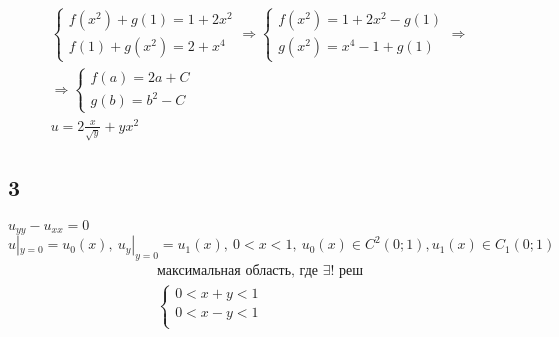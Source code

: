 \begin{gather*}
  \begin{cases}
  f(x^{2})+g(1)=1+2x^{2} \\ f(1)+g(x^{2})=2+x^{4}
  \end{cases} \Rightarrow \begin{cases}
    f(x^{2})=1+2x^{2}-g(1) \\ g(x^{2})=x^{4}-1+g(1)
  \end{cases} \Rightarrow \\
  \Rightarrow \begin{cases}
    f(a)=2a+C \\ g(b)=b^{2}-C
  \end{cases} \\
  \boxed{u= 2\frac{x}{\sqrt{y}}+yx^{2}}
\end{gather*}
\subsection{3}
$u_{yy}-u_{xx}=0$ \\
$u|_{y=0}=u_{0}(x),\ u_{y}|_{y=0}=u_{1}(x), \ 0 < x < 1, \ u_{0}(x) \in C^{2}(0;1), u_{1}(x)
 \in C_{1}(0;1)$ \\ 
\begin{gather*}
  \text{максимальная область, где $\exists$! реш} \\ 
  \begin{cases}
   0 < x + y < 1 \\ 0< x-y<1 \\ 
  \end{cases}
\end{gather*}

